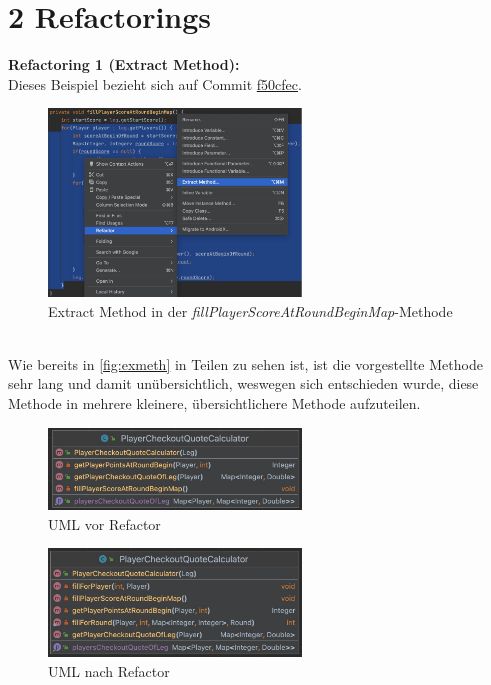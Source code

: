 \section{2 Refactorings}
\textbf{Refactoring 1 (Extract Method):}\\
Dieses Beispiel bezieht sich auf Commit \href{https://github.com/P3lina/ASE-Project/commit/f50cfec78b045a3a62e5927e44d2699f528aee31}{f50cfec}.\\
\begin{figure}[ht]
    \centering
    \includegraphics[width=0.6\textwidth]{Bilder/exmeth.png}
    \caption{Extract Method in der \textit{fillPlayerScoreAtRoundBeginMap}-Methode}
    \label{fig:exmeth}
\end{figure}\\
Wie bereits in \autoref{fig:exmeth} in Teilen zu sehen ist, ist die vorgestellte Methode sehr lang und damit unübersichtlich, weswegen sich entschieden wurde, diese Methode in mehrere kleinere, übersichtlichere Methode aufzuteilen.\\
\begin{figure}[ht]
    \centering
    \includegraphics[width=0.6\textwidth]{Bilder/ref1before.png}
    \caption{UML vor Refactor}
    \label{fig:ref1before}
\end{figure}\newpage
\begin{figure}[ht]
    \centering
    \includegraphics[width=0.6\textwidth]{Bilder/ref1after.png}
    \caption{UML nach Refactor}
    \label{fig:ref1after}
\end{figure}
